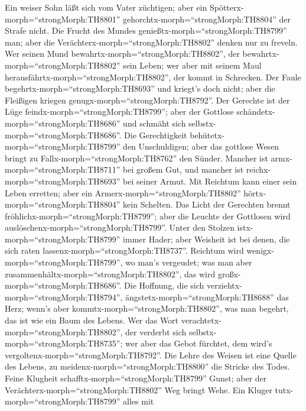  Ein weiser Sohn läßt sich vom Vater züchtigen; aber ein
Spötterx-morph=``strongMorph:TH8801''
gehorchtx-morph=``strongMorph:TH8804'' der Strafe nicht. 
Die Frucht des Mundes genießtx-morph=``strongMorph:TH8799'' man; aber
die Verächterx-morph=``strongMorph:TH8802'' denken nur zu freveln.
 Wer seinen Mund bewahrtx-morph=``strongMorph:TH8802'', der
bewahrtx-morph=``strongMorph:TH8802'' sein Leben; wer aber mit seinem
Maul herausfährtx-morph=``strongMorph:TH8802'', der kommt in Schrecken.
 Der Faule begehrtx-morph=``strongMorph:TH8693'' und
kriegt's doch nicht; aber die Fleißigen kriegen
genugx-morph=``strongMorph:TH8792''.  Der Gerechte ist der
Lüge feindx-morph=``strongMorph:TH8799''; aber der Gottlose
schändetx-morph=``strongMorph:TH8686'' und schmäht sich
selbstx-morph=``strongMorph:TH8686''.  Die Gerechtigkeit
behütetx-morph=``strongMorph:TH8799'' den Unschuldigen; aber das
gottlose Wesen bringt zu Fallx-morph=``strongMorph:TH8762'' den Sünder.
 Mancher ist armx-morph=``strongMorph:TH8711'' bei großem
Gut, und mancher ist reichx-morph=``strongMorph:TH8693'' bei seiner
Armut.  Mit Reichtum kann einer sein Leben erretten; aber
ein Armerx-morph=``strongMorph:TH8802''
hörtx-morph=``strongMorph:TH8804'' kein Schelten.  Das Licht
der Gerechten brennt fröhlichx-morph=``strongMorph:TH8799''; aber die
Leuchte der Gottlosen wird auslöschenx-morph=``strongMorph:TH8799''.
 Unter den Stolzen istx-morph=``strongMorph:TH8799'' immer
Hader; aber Weisheit ist bei denen, die sich raten
lassenx-morph=``strongMorph:TH8737''.  Reichtum wird
wenigx-morph=``strongMorph:TH8799'', wo man's vergeudet; was man aber
zusammenhältx-morph=``strongMorph:TH8802'', das wird
großx-morph=``strongMorph:TH8686''.  Die Hoffnung, die sich
verziehtx-morph=``strongMorph:TH8794'',
ängstetx-morph=``strongMorph:TH8688'' das Herz; wenn's aber
kommtx-morph=``strongMorph:TH8802'', was man begehrt, das ist wie ein
Baum des Lebens.  Wer das Wort
verachtetx-morph=``strongMorph:TH8802'', der verderbt sich
selbstx-morph=``strongMorph:TH8735''; wer aber das Gebot fürchtet, dem
wird's vergoltenx-morph=``strongMorph:TH8792''.  Die Lehre
des Weisen ist eine Quelle des Lebens, zu
meidenx-morph=``strongMorph:TH8800'' die Stricke des Todes.
 Feine Klugheit schafftx-morph=``strongMorph:TH8799''
Gunst; aber der Verächterx-morph=``strongMorph:TH8802'' Weg bringt Wehe.
 Ein Kluger tutx-morph=``strongMorph:TH8799'' alles mit
